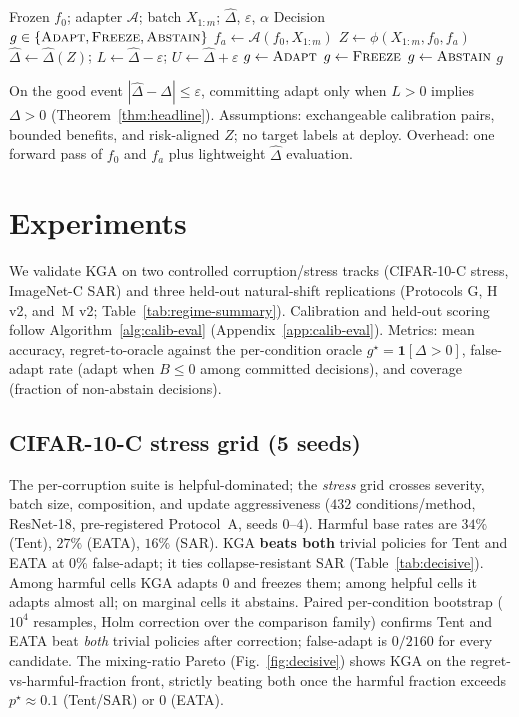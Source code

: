 \documentclass[11pt]{article}
\theoremstyle{plain}
\theoremstyle{definition}
\theoremstyle{remark}
\begin{document}
\begin{algorithm}[t]
\caption{\textsc{KGA}: Knowability-Guided Adaptation}
\label{alg:kga}
\begin{algorithmic}[1]
\Require Frozen $f_0$; adapter $\mathcal{A}$; batch $X_{1:m}$; $\widehat\Delta$, $\varepsilon$, $\alpha$
\Ensure Decision $g\in\{\textsc{Adapt},\textsc{Freeze},\textsc{Abstain}\}$
\State $f_a \leftarrow \mathcal{A}(f_0, X_{1:m})$
\State $Z \leftarrow \phi(X_{1:m}, f_0, f_a)$
\State $\widehat\Delta \leftarrow \widehat\Delta(Z)$;\;
  $L \leftarrow \widehat\Delta-\varepsilon$;\; $U \leftarrow \widehat\Delta+\varepsilon$
 \State $g\leftarrow\textsc{Adapt}$
 \State $g\leftarrow\textsc{Freeze}$
\Else \State $g\leftarrow\textsc{Abstain}$
\EndIf
\State \Return $g$
\end{algorithmic}
\end{algorithm}

On the good event $|\widehat\Delta-\Delta|\le\varepsilon$, committing adapt only when
$L>0$ implies $\Delta>0$ (Theorem~\ref{thm:headline}). Assumptions: exchangeable
calibration pairs, bounded benefits, and risk-aligned $Z$; no target labels at deploy.
Overhead: one forward pass of $f_0$ and $f_a$ plus lightweight $\widehat\Delta$ evaluation.

\section{Experiments}\label{sec:exp}
We validate \textsc{KGA} on two controlled corruption/stress tracks (CIFAR-10-C stress,
ImageNet-C SAR) and three held-out natural-shift replications (Protocols G, H v2, and~M v2;
Table~\ref{tab:regime-summary}). Calibration and held-out scoring follow
Algorithm~\ref{alg:calib-eval} (Appendix~\ref{app:calib-eval}). Metrics: mean accuracy,
regret-to-oracle against the per-condition oracle $g^\star=\mathbf1[\Delta>0]$,
false-adapt rate (adapt when $B\le0$ among committed decisions), and coverage
(fraction of non-abstain decisions).

\subsection{CIFAR-10-C stress grid (5 seeds)}
The per-corruption suite is helpful-dominated; the \emph{stress} grid crosses severity,
batch size, composition, and update aggressiveness ($432$ conditions/method, ResNet-18,
pre-registered Protocol~A, seeds $0$--$4$). Harmful base rates are $34\%$ (Tent),
$27\%$ (EATA), $16\%$ (SAR). \textsc{KGA} \textbf{beats both} trivial policies for
Tent and EATA at $0\%$ false-adapt; it ties collapse-resistant SAR
(Table~\ref{tab:decisive}). Among harmful cells \textsc{KGA} adapts $0$ and freezes them;
among helpful cells it adapts almost all; on marginal cells it abstains. Paired per-condition
bootstrap ($10^4$ resamples, Holm correction over the comparison family) confirms Tent and
EATA beat \emph{both} trivial policies after correction; false-adapt is $0/2160$ for every
candidate. The mixing-ratio Pareto (Fig.~\ref{fig:decisive}) shows \textsc{KGA} on the
regret-vs-harmful-fraction front, strictly beating both once the harmful fraction exceeds
$p^\star{\approx}0.1$ (Tent/SAR) or $0$ (EATA).
\end{document}
